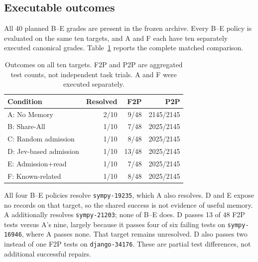 \documentclass[sigconf,anonymous]{aamas}
\begin{document}
\subsection{Executable outcomes}
All 40 planned B--E grades are present in the frozen archive. Every B--E policy is evaluated on the same ten targets, and A and F each have ten separately executed canonical grades. Table~\ref{tab:aggregate} reports the complete matched comparison.

\begin{table}[t]
\caption{Outcomes on all ten targets. F2P and P2P are aggregated test counts, not independent task trials. A and F were executed separately.}
\label{tab:aggregate}
\centering
\begin{tabular}{lrrr}
\toprule
Condition & Resolved & F2P & P2P \\
\midrule
A: No Memory & 2/10 & 9/48 & 2145/2145\\
B: Share-All & 1/10 & 7/48 & 2025/2145\\
C: Random admission & 1/10 & 8/48 & 2025/2145\\
D: Jev-based admission & 1/10 & 13/48 & 2025/2145\\
E: Admission+read & 1/10 & 7/48 & 2025/2145\\
F: Known-related & 1/10 & 8/48 & 2025/2145\\
\bottomrule
\end{tabular}
\end{table}

All four B--E policies resolve \texttt{sympy-19235}, which A also resolves. D and E expose no records on that target, so the shared success is not evidence of useful memory. A additionally resolves \texttt{sympy-21203}; none of B--E does. D passes 13 of 48 F2P tests versus A's nine, largely because it passes four of six failing tests on \texttt{sympy-16946}, where A passes none. That target remains unresolved. D also passes two instead of one F2P tests on \texttt{django-34176}. These are partial test differences, not additional successful repairs.
\end{document}
